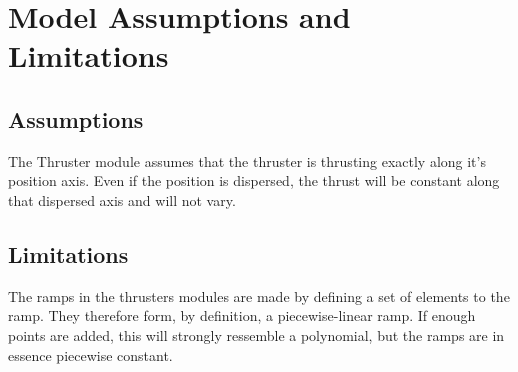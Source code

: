 \section{Model Assumptions and Limitations}

\subsection{Assumptions}

The Thruster module assumes that the thruster is thrusting exactly along it's position axis. Even if the position is dispersed, the thrust will be constant along that dispersed axis and will not vary.

\subsection{Limitations}

The ramps in the thrusters modules are made by defining a set of elements to the ramp. They therefore form, by definition, a piecewise-linear ramp. If enough points are added, this will strongly ressemble a polynomial, but the ramps are in essence piecewise constant.